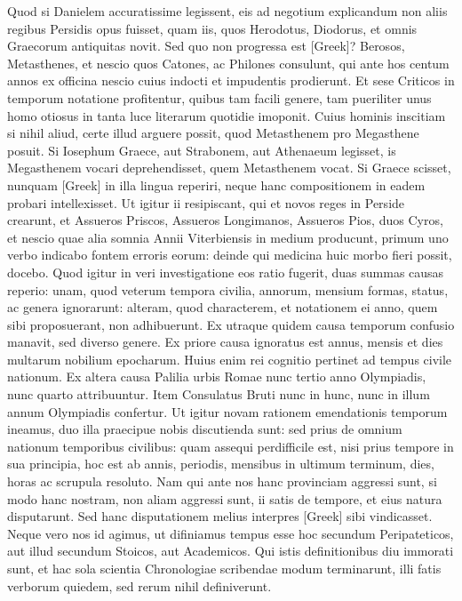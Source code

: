 Quod si Danielem accuratissime legissent,
eis ad negotium explicandum non aliis regibus Persidis opus fuisset,
quam iis, quos Herodotus, Diodorus, et omnis Graecorum antiquitas
novit.
Sed quo non progressa est \textgreek{[Greek]}?
Berosos, Metasthenes, et
nescio quos Catones, ac Philones consulunt, qui ante hos centum annos
ex officina nescio cuius indocti et impudentis prodierunt.
Et sese
Criticos in temporum notatione profitentur, quibus tam facili genere,
tam pueriliter unus homo otiosus in tanta luce literarum quotidie imoponit.
Cuius hominis inscitiam si nihil aliud, certe illud arguere
 possit, quod
Metasthenem pro Megasthene posuit.
Si Iosephum Graece, aut Strabonem,
aut Athenaeum legisset, is Megasthenem vocari deprehendisset,
quem Metasthenem vocat.
Si Graece scisset, nunquam \textgreek{[Greek]} in illa
lingua reperiri, neque hanc compositionem in eadem probari intellexisset.
Ut igitur ii resipiscant, qui et novos reges in Perside crearunt,
et Assueros Priscos, Assueros Longimanos, Assueros Pios, duos Cyros,
et nescio quae alia somnia Annii Viterbiensis in medium producunt,
primum uno verbo indicabo fontem erroris eorum: deinde qui medicina
huic morbo fieri possit, docebo.
Quod igitur in veri investigatione
eos ratio fugerit, duas summas causas reperio: unam, quod veterum
tempora civilia, annorum, mensium formas, status, ac genera ignorarunt:
alteram, quod characterem, et notationem ei anno, quem sibi
proposuerant, non adhibuerunt.
Ex utraque quidem causa temporum
confusio manavit, sed diverso genere.
Ex priore causa ignoratus est
annus, mensis et dies multarum nobilium epocharum.
Huius enim
rei cognitio pertinet ad tempus civile nationum.
Ex altera causa Palilia
urbis Romae nunc tertio anno Olympiadis, nunc quarto attribuuntur.
Item Consulatus Bruti nunc in hunc, nunc in illum annum
Olympiadis confertur.
Ut igitur novam rationem emendationis temporum
ineamus, duo illa praecipue nobis discutienda sunt: sed prius
de omnium nationum temporibus civilibus: quam assequi perdifficile
est, nisi prius tempore in sua principia, hoc est ab annis, periodis,
mensibus in ultimum terminum, dies, horas ac scrupula resoluto.
Nam qui ante nos hanc provinciam aggressi sunt, si modo hanc nostram,
non aliam aggressi sunt, ii satis de tempore, et eius natura
disputarunt.
Sed hanc disputationem melius interpres \textgreek{[Greek]}
sibi vindicasset.
Neque vero nos id agimus, ut difiniamus
tempus esse hoc secundum Peripateticos, aut illud secundum Stoicos,
aut Academicos.
Qui istis definitionibus diu immorati sunt, et hac
sola scientia Chronologiae scribendae modum terminarunt, illi fatis
verborum quiedem, sed rerum nihil definiverunt.

